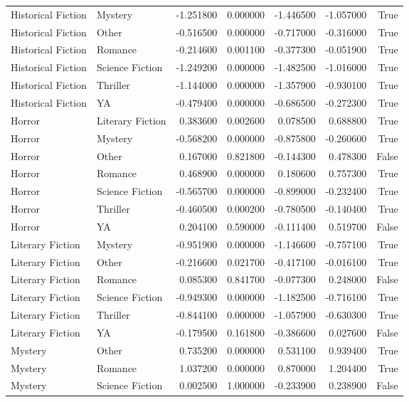 \begin{tabular}{llrrrrr}
Historical Fiction & Mystery & -1.251800 & 0.000000 & -1.446500 & -1.057000 & True \\
Historical Fiction & Other & -0.516500 & 0.000000 & -0.717000 & -0.316000 & True \\
Historical Fiction & Romance & -0.214600 & 0.001100 & -0.377300 & -0.051900 & True \\
Historical Fiction & Science Fiction & -1.249200 & 0.000000 & -1.482500 & -1.016000 & True \\
Historical Fiction & Thriller & -1.144000 & 0.000000 & -1.357900 & -0.930100 & True \\
Historical Fiction & YA & -0.479400 & 0.000000 & -0.686500 & -0.272300 & True \\
Horror & Literary Fiction & 0.383600 & 0.002600 & 0.078500 & 0.688800 & True \\
Horror & Mystery & -0.568200 & 0.000000 & -0.875800 & -0.260600 & True \\
Horror & Other & 0.167000 & 0.821800 & -0.144300 & 0.478300 & False \\
Horror & Romance & 0.468900 & 0.000000 & 0.180600 & 0.757300 & True \\
Horror & Science Fiction & -0.565700 & 0.000000 & -0.899000 & -0.232400 & True \\
Horror & Thriller & -0.460500 & 0.000200 & -0.780500 & -0.140400 & True \\
Horror & YA & 0.204100 & 0.590000 & -0.111400 & 0.519700 & False \\
Literary Fiction & Mystery & -0.951900 & 0.000000 & -1.146600 & -0.757100 & True \\
Literary Fiction & Other & -0.216600 & 0.021700 & -0.417100 & -0.016100 & True \\
Literary Fiction & Romance & 0.085300 & 0.841700 & -0.077300 & 0.248000 & False \\
Literary Fiction & Science Fiction & -0.949300 & 0.000000 & -1.182500 & -0.716100 & True \\
Literary Fiction & Thriller & -0.844100 & 0.000000 & -1.057900 & -0.630300 & True \\
Literary Fiction & YA & -0.179500 & 0.161800 & -0.386600 & 0.027600 & False \\
Mystery & Other & 0.735200 & 0.000000 & 0.531100 & 0.939400 & True \\
Mystery & Romance & 1.037200 & 0.000000 & 0.870000 & 1.204400 & True \\
Mystery & Science Fiction & 0.002500 & 1.000000 & -0.233900 & 0.238900 & False \\

\end{tabular}
